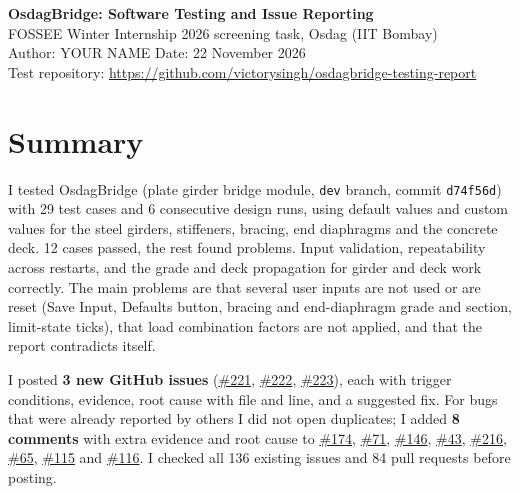 \documentclass[10pt,a4paper]{article}
\begin{document}
\begin{center}
{\LARGE\bfseries OsdagBridge: Software Testing and Issue Reporting}\\[4pt]
FOSSEE Winter Internship 2026 screening task, Osdag (IIT Bombay)\\[2pt]
Author: YOUR NAME \quad Date: 22 November 2026\\[2pt]
Test repository: \href{https://github.com/victorysingh/osdagbridge-testing-report}{https://github.com/victorysingh/osdagbridge-testing-report}
\end{center}

\section{Summary}
I tested OsdagBridge (plate girder bridge module, \texttt{dev} branch, commit \texttt{d74f56d}) with 29 test cases and 6 consecutive design runs, using default values and custom values for the steel girders, stiffeners, bracing, end diaphragms and the concrete deck. 12 cases passed, the rest found problems. Input validation, repeatability across restarts, and the grade and deck propagation for girder and deck work correctly. The main problems are that several user inputs are not used or are reset (Save Input, Defaults button, bracing and end-diaphragm grade and section, limit-state ticks), that load combination factors are not applied, and that the report contradicts itself.

I posted \textbf{3 new GitHub issues} (\href{https://github.com/Nidhikhare12/OsdagBridge/issues/221}{\#221}, \href{https://github.com/Nidhikhare12/OsdagBridge/issues/222}{\#222}, \href{https://github.com/Nidhikhare12/OsdagBridge/issues/223}{\#223}), each with trigger conditions, evidence, root cause with file and line, and a suggested fix. For bugs that were already reported by others I did not open duplicates; I added \textbf{8 comments} with extra evidence and root cause to \href{https://github.com/Nidhikhare12/OsdagBridge/issues/174}{\#174}, \href{https://github.com/Nidhikhare12/OsdagBridge/issues/71}{\#71}, \href{https://github.com/Nidhikhare12/OsdagBridge/issues/146}{\#146}, \href{https://github.com/Nidhikhare12/OsdagBridge/issues/43}{\#43}, \href{https://github.com/Nidhikhare12/OsdagBridge/issues/216}{\#216}, \href{https://github.com/Nidhikhare12/OsdagBridge/issues/65}{\#65}, \href{https://github.com/Nidhikhare12/OsdagBridge/issues/115}{\#115} and \href{https://github.com/Nidhikhare12/OsdagBridge/issues/116}{\#116}. I checked all 136 existing issues and 84 pull requests before posting.
\end{document}
